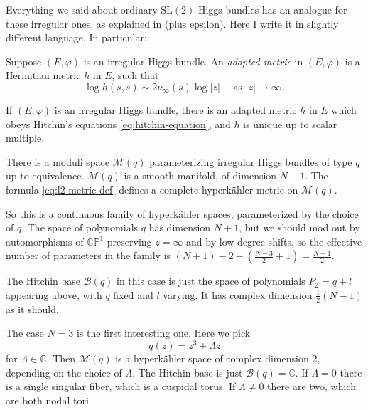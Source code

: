 \documentclass[12pt,letterpaper,reqno]{article}
\numberwithin{equation}{section}
\newcommand{\cB}{\ensuremath{\mathcal B}}
\newcommand{\cM}{\ensuremath{\mathcal M}}
\newcommand{\bbC}{\ensuremath{\mathbb C}}
\newcommand{\bbP}{\ensuremath{\mathbb P}}
\newcommand{\hk}{hyperk\"ahler\xspace}
\newcommand{\abs}[1]{\lvert#1\rvert}
\newcommand{\ti}[1]{\textit{#1}}
\newcommand{\SL}{\mathrm{SL}}
\begin{document}
Everything we said about ordinary $\SL(2)$-Higgs bundles has an analogue for these 
irregular ones, as explained in \cite{wnh} (plus epsilon).
Here I write it in slightly different language.
In particular:

\begin{defn}
Suppose $(E,\varphi)$ is an irregular Higgs bundle. An \ti{adapted metric} in $(E,\varphi)$ is a Hermitian metric $h$ in $E$, such that
\begin{equation}
\log h(s,s) \sim 2 \nu_\infty(s) \log \abs{z} \quad \text{ as } \abs{z} \to \infty \, . 
\end{equation}
\end{defn}

\begin{thm}
If $(E,\varphi)$ is an irregular Higgs bundle, there is an adapted metric $h$ in $E$ which obeys Hitchin's equations \eqref{eq:hitchin-equation}, and $h$ is unique up to scalar multiple.
\end{thm}

\begin{thm}
There is a moduli space $\cM(q)$ parameterizing irregular Higgs bundles of type $q$ up to equivalence.
$\cM(q)$ is a smooth manifold, of dimension $N-1$.
The formula \eqref{eq:l2-metric-def} defines a complete \hk metric on $\cM(q)$.
\end{thm}

So this is a continuous family of \hk spaces, parameterized by the choice of $q$.
The space of polynomials $q$ has dimension $N+1$, but we should mod out by automorphisms
of $\bbC\bbP^1$ preserving $z = \infty$ and by low-degree shifts,
so the effective number of parameters in the family 
is $(N+1) - 2 - (\frac{N-3}{2} + 1) = \frac{N-1}{2}$.

The Hitchin base $\cB(q)$ in this case is just the space of polynomials 
$P_2 = q + l$ appearing above, with $q$ fixed and $l$ varying.
It has complex dimension $\frac12(N-1)$ as it should.

\begin{example}
The case $N=3$ is the first interesting one. Here we pick
\begin{equation}
  q(z) = z^3 + \Lambda z
\end{equation}
for $\Lambda \in \bbC$. Then $\cM(q)$ is a \hk space of complex dimension $2$,
depending on the choice of $\Lambda$. The Hitchin base is just $\cB(q) = \bbC$.
If $\Lambda = 0$ there is a single singular fiber, which is a cuspidal torus.
If $\Lambda \neq 0$ there are two, which are both nodal tori.
\end{example}
\end{document}
